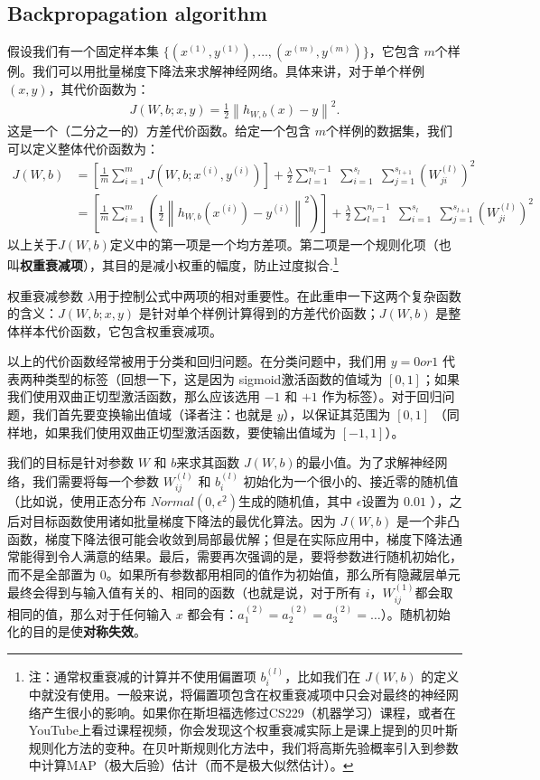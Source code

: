 \subsection{Backpropagation algorithm}
假设我们有一个固定样本集 $ \{ (x^{(1)}, y^{(1)}), \ldots, (x^{(m)}, y^{(m)}) \}$，它包含 $ m $个样例。我们可以用批量梯度下降法来求解神经网络。具体来讲，对于单个样例 $ (x,y)$，其代价函数为：
\begin{align}
J(W,b; x,y) = \frac{1}{2} \left\| h_{W,b}(x) - y \right\|^2.
\nonumber \end{align}
这是一个（二分之一的）方差代价函数。给定一个包含 $ m $个样例的数据集，我们可以定义整体代价函数为：
\begin{align}
J(W,b)
&= \left[ \frac{1}{m} \sum_{i=1}^m J(W,b;x^{(i)},y^{(i)}) \right]
                       + \frac{\lambda}{2} \sum_{l=1}^{n_l-1} \; \sum_{i=1}^{s_l} \; \sum_{j=1}^{s_{l+1}} \left( W^{(l)}_{ji} \right)^2
 \nonumber \\
&= \left[ \frac{1}{m} \sum_{i=1}^m \left( \frac{1}{2} \left\| h_{W,b}(x^{(i)}) - y^{(i)} \right\|^2 \right) \right]
                       + \frac{\lambda}{2} \sum_{l=1}^{n_l-1} \; \sum_{i=1}^{s_l} \; \sum_{j=1}^{s_{l+1}} \left( W^{(l)}_{ji} \right)^2
\nonumber \end{align}
以上关于$ J(W,b)$定义中的第一项是一个均方差项。第二项是一个规则化项（也叫\textbf{权重衰减项}），其目的是减小权重的幅度，防止过度拟合.\footnote{注：通常权重衰减的计算并不使用偏置项 $ b^{(l)}_i$，比如我们在 $ J(W, b)$ 的定义中就没有使用。一般来说，将偏置项包含在权重衰减项中只会对最终的神经网络产生很小的影响。如果你在斯坦福选修过CS229（机器学习）课程，或者在YouTube上看过课程视频，你会发现这个权重衰减实际上是课上提到的贝叶斯规则化方法的变种。在贝叶斯规则化方法中，我们将高斯先验概率引入到参数中计算MAP（极大后验）估计（而不是极大似然估计）。}

权重衰减参数 $ \lambda $用于控制公式中两项的相对重要性。在此重申一下这两个复杂函数的含义：$ J(W,b;x,y)$ 是针对单个样例计算得到的方差代价函数；$ J(W,b)$ 是整体样本代价函数，它包含权重衰减项。

以上的代价函数经常被用于分类和回归问题。在分类问题中，我们用 $ y = 0 or  1$ 代表两种类型的标签（回想一下，这是因为 sigmoid激活函数的值域为 $ [0,1]$；如果我们使用双曲正切型激活函数，那么应该选用 $ -1$ 和 $ +1$ 作为标签）。对于回归问题，我们首先要变换输出值域（译者注：也就是 $ y$），以保证其范围为 $ [0,1]$ （同样地，如果我们使用双曲正切型激活函数，要使输出值域为 $ [-1,1]$）。

我们的目标是针对参数 $ W$ 和 $ b $来求其函数 $ J(W,b) $的最小值。为了求解神经网络，我们需要将每一个参数 $ W^{(l)}_{ij}$ 和 $ b^{(l)}_i$ 初始化为一个很小的、接近零的随机值（比如说，使用正态分布 $ {Normal}(0,\epsilon^2) $生成的随机值，其中 $ \epsilon $设置为 $ 0.01$ ），之后对目标函数使用诸如批量梯度下降法的最优化算法。因为 $ J(W, b)$ 是一个非凸函数，梯度下降法很可能会收敛到局部最优解；但是在实际应用中，梯度下降法通常能得到令人满意的结果。最后，需要再次强调的是，要将参数进行随机初始化，而不是全部置为 $ 0$。如果所有参数都用相同的值作为初始值，那么所有隐藏层单元最终会得到与输入值有关的、相同的函数（也就是说，对于所有 $ i$，$ W^{(1)}_{ij}$都会取相同的值，那么对于任何输入 $ x$ 都会有：$ a^{(2)}_1 = a^{(2)}_2 = a^{(2)}_3 = \ldots $）。随机初始化的目的是使\textbf{对称失效}。

